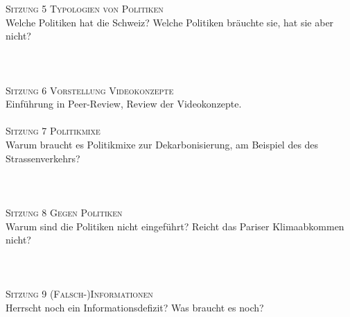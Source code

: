 \documentclass[12pt,a4paper]{article}
\begin{document}
\textsc{Sitzung 5 \dotfill Typologien von Politiken}  \smallskip \\ 
{\color{darkgreen}{\Rectangle}} Welche Politiken hat die Schweiz? Welche Politiken bräuchte sie, hat sie aber nicht? \\
{\color{darkgreen}{\Rectangle}} \\
{\color{darkgreen}{\Rectangle}} \\
\medskip  \\	

\textsc{Sitzung 6 \dotfill Vorstellung Videokonzepte} \smallskip \\ 
{\color{darkgreen}{\Rectangle}} Einführung in Peer-Review, Review der Videokonzepte.\\
\medskip  \\	


\textsc{Sitzung 7 \dotfill Politikmixe} \smallskip \\ 
{\color{darkgreen}{\Rectangle}} Warum braucht es Politikmixe zur Dekarbonisierung, am Beispiel des des Strassenverkehrs? \\ 
{\color{darkgreen}{\Rectangle}}  \\  
{\color{darkgreen}{\Rectangle}}  \\  
\medskip  \\	


\textsc{Sitzung 8 \dotfill Gegen Politiken}  \smallskip \\ 
{\color{darkgreen}{\Rectangle}}  Warum sind die Politiken nicht eingeführt? Reicht das Pariser Klimaabkommen nicht? \\%
{\color{darkgreen}{\Rectangle}}  \\
{\color{darkgreen}{\Rectangle}}  \\  
\medskip  \\	


\textsc{Sitzung 9 \dotfill (Falsch-)Informationen}  \smallskip \\ 
{\color{darkgreen}{\Rectangle}} Herrscht noch ein Informationsdefizit? Was braucht es noch? \\
{\color{darkgreen}{\Rectangle}}  \\
{\color{darkgreen}{\Rectangle}}  \\
{\color{darkgreen}{\Rectangle}}  \\
\medskip  \\	
\end{document}
